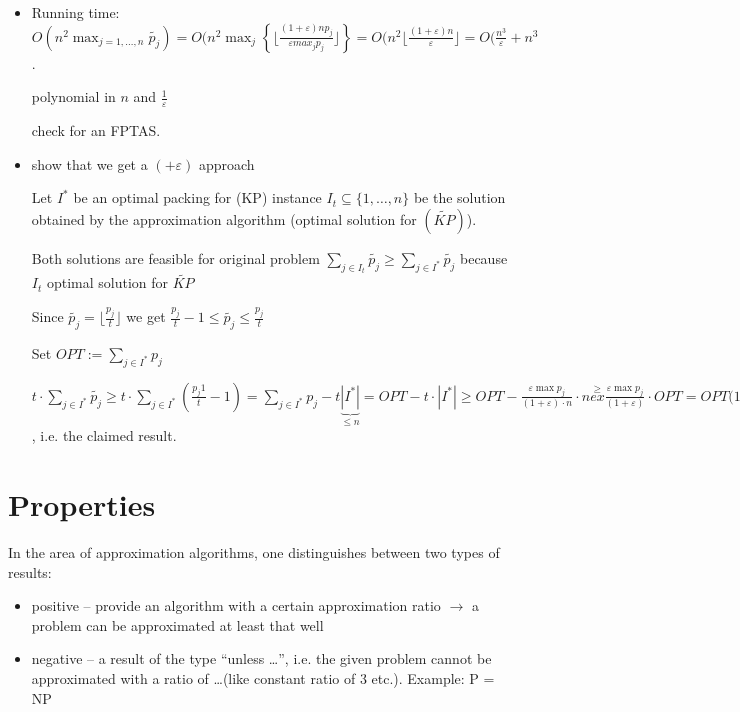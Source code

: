 \documentclass[11pt]{article}
\theoremstyle{definition}
\theoremstyle{definition}
\begin{document}
\begin{itemize}
\item Running time: $ O(n^2 \max_{j = 1, \dots, n} \tilde{p_j}) = O(n^2 \max_j \left \{  \lfloor \frac{(1 + \varepsilon) n p_j}{\varepsilon max_j p_j} \rfloor  \right \} = O(n^2 \lfloor \frac{(1 + \varepsilon) n}{\varepsilon} \rfloor = O(\frac{n^3}{\varepsilon} + n^3 $. \newline

polynomial in $ n $ and $ \frac{1}{\varepsilon} $ \newline

check for an FPTAS.
\item show that we get a $( + \varepsilon) $ approach \newline

Let $ I^\ast $ be an optimal packing for (KP) instance $ I_t \subseteq \{1, \dots, n \} $ be the solution obtained by the approximation algorithm (optimal solution for $ (\tilde{KP}) $). \newline

Both solutions are feasible for original problem $ \sum \limits_{j \in I_t} \tilde{p_j} \geq \sum \limits_{j \in I^\ast} \tilde{p_j} $ because $ I_t $ optimal solution for $ \tilde{KP} $ \newline

Since $ \tilde{p_j} = \lfloor \frac{p_j}{t} \rfloor $ we get $ \frac{p_j}{t} - 1 \leq \tilde{p_j} \leq \frac{p_j}{t} $

Set $ OPT := \sum \limits_{j \in I^\ast} p_j $

$ t \cdot \sum \limits_{j \in I^\ast} \tilde{p_j} \geq t \cdot \sum \limits_{j \in I^\ast} (\frac{p_j1}{t} - 1) = \sum \limits_{j \in I^\ast} p_j - t \underbrace{|I^\ast|}_{\leq n} = OPT - t \cdot |I^\ast| \geq OPT - \frac{\varepsilon \max p_j}{(1 + \varepsilon) \cdot n} \cdot n \overset{\geq}{ex}  \frac{\varepsilon \max p_j}{(1 + \varepsilon)} \cdot OPT = OPT(1 - \frac{\varepsilon}{1 + \varepsilon} =  \frac{1}{1 + \varepsilon} $, i.e. the claimed result.
\end{itemize}

\section{Properties}
In the area of approximation algorithms, one distinguishes between two types of results:
\begin{itemize}
\item positive – provide an algorithm with a certain approximation ratio $ \rightarrow $ a problem can be approximated at least that well
\item negative – a result of the type ``unless \dots'', i.e. the given problem cannot be approximated with a ratio of \dots (like constant ratio of 3 etc.). Example: P = NP
\end{itemize}
\end{document}
